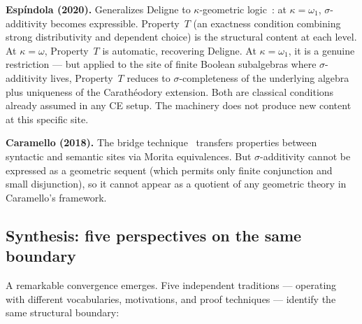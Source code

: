 \medskip\noindent
\textbf{Esp\'{i}ndola (2020).}  Generalizes Deligne to
$\kappa$-geometric logic~\cite{Espindola2020}: at
$\kappa = \omega_1$, $\sigma$-additivity becomes expressible.
Property~$T$ (an exactness condition combining strong
distributivity and dependent choice) is the structural content at
each level.  At $\kappa = \omega$, Property~$T$ is automatic,
recovering Deligne.  At $\kappa = \omega_1$, it is a genuine
restriction --- but applied to the site of finite Boolean
subalgebras where $\sigma$-additivity lives, Property~$T$ reduces
to $\sigma$-completeness of the underlying algebra plus uniqueness
of the Carath\'{e}odory extension.  Both are classical conditions
already assumed in any CE setup.  The machinery does not produce new
content at this specific site.

\medskip\noindent
\textbf{Caramello (2018).}  The bridge technique~\cite{Caramello2018}
transfers properties between syntactic and semantic sites via Morita
equivalences.  But $\sigma$-additivity cannot be expressed as a
geometric sequent (which permits only finite conjunction and small
disjunction), so it cannot appear as a quotient of any geometric
theory in Caramello's framework.

\subsection{Synthesis: five perspectives on the same boundary}
\label{sec:extension-synthesis}

A remarkable convergence emerges.  Five independent traditions ---
operating with different vocabularies, motivations, and proof
techniques --- identify the same structural boundary:

